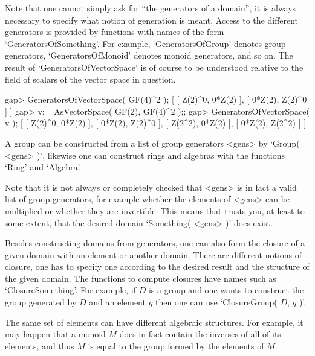 Note that one cannot simply ask for ``the generators of a domain'',
it is always necessary to specify what notion of generation is meant.
Access to the different generators is provided by functions with
names of the form `GeneratorsOfSomething'.
For example, `GeneratorsOfGroup' denotes group generators,
`GeneratorsOfMonoid' denotes monoid generators, and so on.
The result of `GeneratorsOfVectorSpace' is of course to be understood
relative to the field of scalars of the vector space in question.

\beginexample
gap> GeneratorsOfVectorSpace( GF(4)^2 );
[ [ Z(2)^0, 0*Z(2) ], [ 0*Z(2), Z(2)^0 ] ]
gap> v:= AsVectorSpace( GF(2), GF(4)^2 );;
gap> GeneratorsOfVectorSpace( v );
[ [ Z(2)^0, 0*Z(2) ], [ 0*Z(2), Z(2)^0 ], [ Z(2^2), 0*Z(2) ], 
  [ 0*Z(2), Z(2^2) ] ]
\endexample



A group can be constructed from a list of group generators <gens> by
`Group( <gens> )',
likewise one can construct rings and algebras with the functions `Ring'
and `Algebra'.

Note that it is not always or completely checked that <gens> is in
fact a valid list of group generators, for example whether the
elements of <gens> can be multiplied or whether they are invertible.
This means that {\GAP} trusts you, at least to some extent, that the
desired domain `Something( <gens> )' does exist.



Besides constructing domains from generators, one can also form the
closure of a given domain with an element or another domain.
There are different notions of closure, one has to specify one
according to the desired result and the structure of the given domain.
The functions to compute closures have names such as
`ClosureSomething'.
For example, if $D$ is a group and one wants to construct the group
generated by $D$ and an element $g$ then one can use
`ClosureGroup( $D$, $g$ )'.



The same set of elements can have different algebraic structures.
For example, it may happen that a monoid $M$ does in fact contain
the inverses of all of its elements, and thus $M$ is equal to the group
formed by the elements of $M$.

